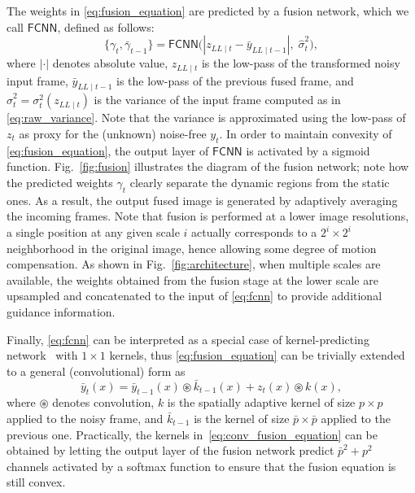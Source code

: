 \documentclass[final]{cvpr}
\newcommand{\LL}{\scriptscriptstyle{LL\mid}}
\newcommand{\comma}{,\;}
\begin{document}
    The weights in \eqref{eq:fusion_equation} are predicted by a fusion network, which we call $\mathsf{FCNN}$, defined as follows:
    \begin{equation}
        \big\{\gamma_t, \bar{\gamma}_{t-1}\big\} = \mathsf{FCNN}\Big( \left\lvert z_{\LL t} - \bar{y}_{\LL t-1}\right\rvert \comma \hat{\sigma}^2_t \Big),
        \label{eq:fcnn}
    \end{equation}
    where $\lvert\cdot\rvert$ denotes absolute value, $z_{\LL t}$ is the low-pass of the transformed noisy input frame, $\bar{y}_{\LL t-1}$ is the low-pass of the previous fused frame, and $\hat{\sigma}^2_t = \sigma^2_t\left(z_{\LL t}\right)$ is the variance of the input frame computed as in \eqref{eq:raw_variance}. Note that the variance is approximated using the low-pass of $z_t$ as proxy for the (unknown) noise-free $y_t$. In order to maintain convexity of \eqref{eq:fusion_equation}, the output layer of $\mathsf{FCNN}$ is activated by a sigmoid function. Fig.~\ref{fig:fusion} illustrates the diagram of the fusion network; note how the predicted weights $\gamma_t$ clearly separate the dynamic regions from the static ones. As a result, the output fused image is generated by adaptively averaging the incoming frames. Note that fusion is performed at a lower image resolutions, a single position at any given scale $i$ actually corresponds to a $2^i\times 2^i$ neighborhood in the original image, hence allowing some degree of motion compensation. As shown in Fig.~\ref{fig:architecture}, when multiple scales are available, the weights obtained from the fusion stage at the lower scale are upsampled and concatenated to the input of \eqref{eq:fcnn} to provide additional guidance information.

    Finally, \eqref{eq:fcnn} can be interpreted as a special case of kernel-predicting network~\cite{mildenhall2018kpn} with $1 \times 1$ kernels, thus \eqref{eq:fusion_equation} can be trivially extended to a general (convolutional) form as
    \begin{equation}
        \bar{y}_t(x) = \bar{y}_{t-1}(x) \circledast \bar{k}_{t-1}(x) + z_t(x) \circledast k(x),
        \label{eq:conv_fusion_equation}
    \end{equation}
    where $\circledast$ denotes convolution, $k$ is the spatially adaptive kernel of size $p \times p$ applied to the noisy frame, and $\bar{k}_{t-1}$ is the kernel of size $\bar{p} \times \bar{p}$ applied to the previous one. Practically, the kernels in~\eqref{eq:conv_fusion_equation} can be obtained by letting the output layer of the fusion network predict $\bar{p}^2+p^2$ channels activated by a softmax function to ensure that the fusion equation is still convex. 
    
\end{document}
